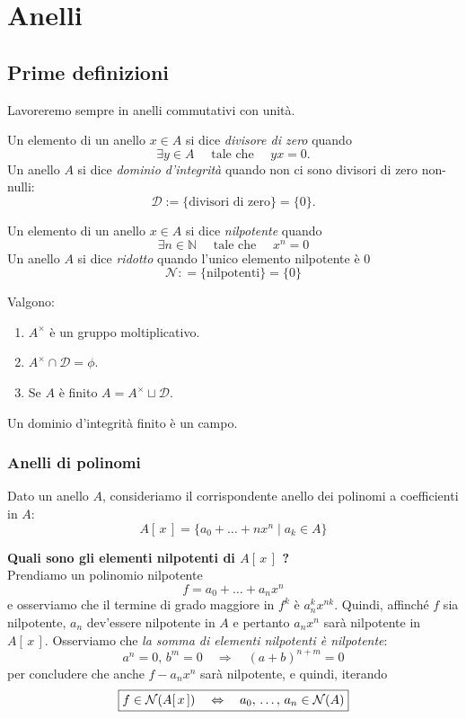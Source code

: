 \setcounter{section}{0} %
\section{Anelli}
\subsection{Prime definizioni}
\begin{multicols}{2}
Lavoreremo sempre in anelli commutativi con unità.

\begin{definition}[Divisori di 0]
	Un elemento di un anello $ x \in A $ si dice \emph{divisore di zero} quando
	\[ \exists y \in A \quad\text{    tale che    }\quad yx = 0. \]
	Un anello $ A $ si dice \emph{dominio d'integrità} quando non ci sono divisori di zero non-nulli:
	\[ \mathcal{D}:= \{\text{divisori di zero}\} = \{0\}. \]
\end{definition}
\begin{definition}[Nilpotenza]
	Un elemento di un anello $ x \in A $ si dice \emph{nilpotente} quando
	 \[ \exists n \in \mathbb{N} \quad\text{    tale che    }\quad x^n = 0 \]
	 Un anello $ A $ si dice \emph{ridotto} quando l'unico elemento nilpotente è 0
	 \[ \mathcal{N}: = \{\text{nilpotenti}\} = \{0\} \]
\end{definition}

\begin{prop}
	Valgono:
	\begin{enumerate}
		\item $ A^\times $ è un gruppo moltiplicativo.
		\item $ A^\times \cap \mathcal{D} = \phi $.
		\item Se $ A $ è finito $ A = A^\times \sqcup \mathcal{D} $.
	\end{enumerate}
\end{prop}
\begin{remark}
	Un dominio d'integrità finito è un campo.
\end{remark}

\subsubsection{Anelli di polinomi}
Dato un anello $ A $, consideriamo il corrispondente anello dei polinomi a coefficienti in $ A $: $$  A[\,x\,] = \{ a_0 + \dots + n x^n \mid a_k \in A \}  $$

\textbf{Quali sono gli elementi nilpotenti di $ A[\,x\,] $ ?} \\
Prendiamo un polinomio nilpotente 
\[ f = a_0 + \dots + a_nx^n \]
e osserviamo che il termine di grado maggiore in $ f^k $ è $ a_n^kx^{nk} $. Quindi, affinché $ f $ sia nilpotente, $ a_n $ dev'essere nilpotente in $ A $ e pertanto $ a_nx^n $ sarà nilpotente in $ A[\, x\,] $. Osserviamo che \emph{la somma di elementi nilpotenti è nilpotente}:
\[ a^n = 0,\, b^m = 0 \quad\Rightarrow\quad (a+b)^{n+m} = 0 \]
per concludere che anche $ f-a_nx^n $ sarà nilpotente, e quindi, iterando
\[ \boxed{f \in \mathcal{N}(A[\,x\,]) \quad\Leftrightarrow\quad a_0, \,\dots,\, a_n \in \mathcal{N}(A)}  \]


\end{multicols}
